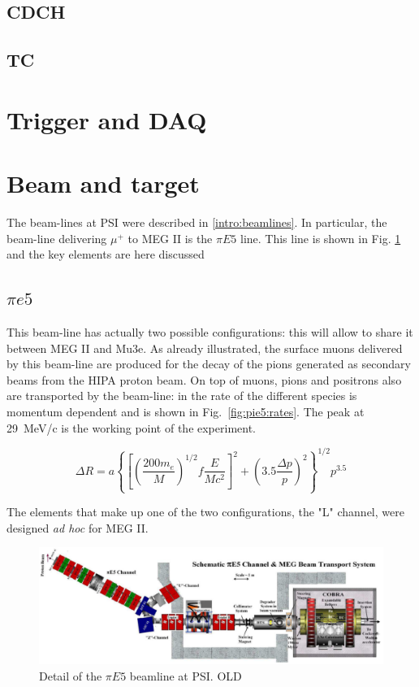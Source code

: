 \begin{refsection}
    \subsection{CDCH}
    \subsection{TC}
\section{Trigger and DAQ}
\section{Beam and target}
    The beam-lines at PSI were described in \ref{intro:beamlines}. 
    In particular, the beam-line delivering $\mu^+$ to MEG II is the $\pi E5$ line. 
    This line is shown in  Fig. \ref{fig:pie5} and the key elements are here discussed

\subsection{$\pi e5$}
    This beam-line has actually two possible configurations: this will allow to share it between MEG II and Mu3e. 
    As already illustrated, the surface muons delivered by this beam-line are produced for the decay of the pions generated as secondary beams from the HIPA proton beam.
    On top of muons, pions and positrons also are transported by the beam-line: in  the rate of the different species is momentum dependent and is shown in Fig.~\ref{fig:pie5:rates}.
    The peak at \SI{29}{MeV/c} is the working point of the experiment.

\begin{equation}
    \Delta R = a \left\{
        \left[  
            \left( \frac{200 m_e}{M}\right)^{1/2} f \frac{E}{Mc^2}
        \right]^2 + 
        \left( 3.5\frac{\Delta p }{p}\right)^2
    \right\} ^{1/2} p^{3.5}
\end{equation}

    \noindent The elements that make up one of the two configurations, the "L" channel, were designed \textit{ad hoc} for MEG II.

    \begin{figure}
        \centering
        \includegraphics[width = \textwidth]{Figures/MEG/pie5_beamline.png}
        \caption{Detail of the $\pi E5$ beamline at PSI. OLD}
        \label{fig:pie5}
    \end{figure}


\end{refsection}
